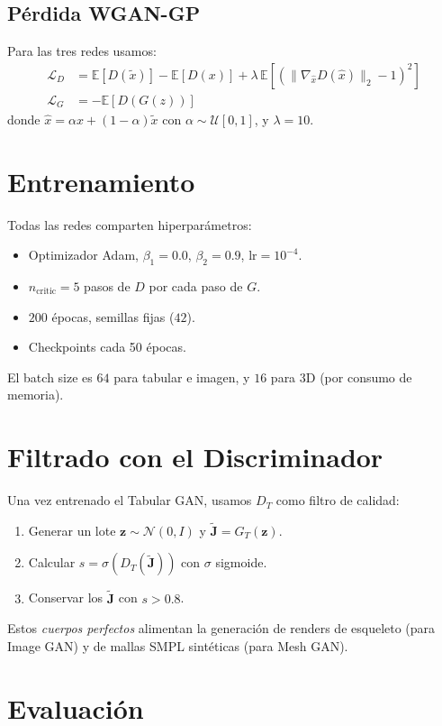 \documentclass[11pt,a4paper,twocolumn]{article}
\begin{document}
\subsection{Pérdida WGAN-GP}
Para las tres redes usamos:
\begin{align}
\mathcal{L}_D &= \mathbb{E}[D(\tilde{x})] - \mathbb{E}[D(x)] + \lambda\,\mathbb{E}\left[\left(\|\nabla_{\hat{x}} D(\hat{x})\|_2 - 1\right)^2\right]\\
\mathcal{L}_G &= -\mathbb{E}[D(G(z))]
\end{align}
donde $\hat{x} = \alpha x + (1-\alpha)\tilde{x}$ con $\alpha\sim\mathcal{U}[0,1]$, y $\lambda=10$.

\section{Entrenamiento}

Todas las redes comparten hiperparámetros:
\begin{itemize}
  \item Optimizador Adam, $\beta_1=0.0$, $\beta_2=0.9$, $\text{lr}=10^{-4}$.
  \item $n_\text{critic}=5$ pasos de $D$ por cada paso de $G$.
  \item $200$ épocas, semillas fijas ($42$).
  \item Checkpoints cada 50 épocas.
\end{itemize}
El batch size es $64$ para tabular e imagen, y $16$ para 3D (por consumo de memoria).

\section{Filtrado con el Discriminador}

Una vez entrenado el Tabular GAN, usamos $D_T$ como filtro de calidad:
\begin{enumerate}
  \item Generar un lote $\mathbf{z}\sim\mathcal{N}(0,I)$ y $\tilde{\mathbf{J}} = G_T(\mathbf{z})$.
  \item Calcular $s = \sigma(D_T(\tilde{\mathbf{J}}))$ con $\sigma$ sigmoide.
  \item Conservar los $\tilde{\mathbf{J}}$ con $s > 0.8$.
\end{enumerate}
Estos \textit{cuerpos perfectos} alimentan la generación de renders de
esqueleto (para Image GAN) y de mallas SMPL sintéticas (para Mesh GAN).

\section{Evaluación}
\end{document}

